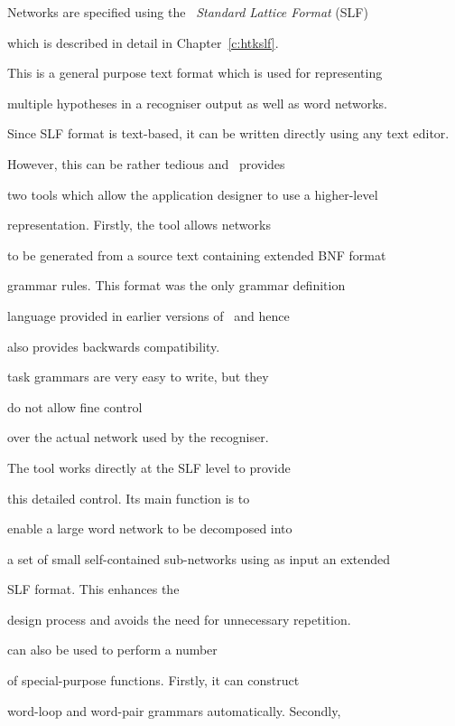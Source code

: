 Networks are specified using the \HTK\ \textit{Standard Lattice Format} (SLF)


which is described in detail in Chapter~\ref{c:htkslf}.


This is a general purpose text format which is used for representing


multiple hypotheses in a recogniser output as well as word networks.  


Since SLF format is text-based, it can be written directly using any text editor.


However, this can be rather tedious and \HTK\ provides


two tools which allow the application designer to use a higher-level


representation.  Firstly, the tool  allows networks


to be generated from a source text containing extended BNF format


grammar rules.  This format was the only grammar definition


language provided in earlier versions of \HTK\ and hence 


 also provides backwards compatibility. 







 task grammars are very easy to write, but they 


do not allow fine control


over the actual network used by the recogniser. 


The tool  works directly at the SLF level to provide


this detailed control.  Its main function is to 


enable a large word network to be decomposed into


a set of small self-contained sub-networks using as input an extended


SLF format.  This enhances the


design process and avoids the need for unnecessary repetition.





 can also be used to perform a number


of special-purpose functions.  Firstly, it can construct 


word-loop and word-pair grammars automatically.  Secondly,


